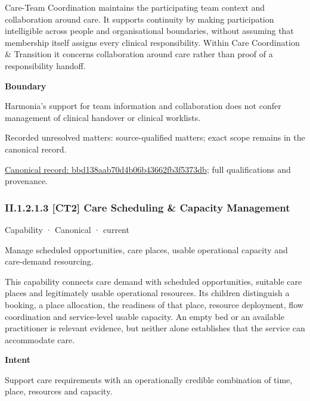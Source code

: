 Care-Team Coordination maintains the participating team context and collaboration around care. It supports continuity by making participation intelligible across people and organisational boundaries, without assuming that membership itself assigns every clinical responsibility. Within Care Coordination \& Transition it concerns collaboration around care rather than proof of a responsibility handoff.



\textbf{Boundary}



Harmonia's support for team information and collaboration does not confer management of clinical handover or clinical worklists.


{\small Recorded unresolved matters: source-qualified matters; exact scope remains in the canonical record.}\par
{\footnotesize \href{../../../../continuum/strategy/capability/bbd138aab70d4b06b43662fb3f5373db.md}{Canonical record: bbd138aab70d4b06b43662fb3f5373db}; full qualifications and provenance.}\par
\subsubsection*{II.1.2.1.3 [CT2] Care Scheduling \& Capacity Management}
\label{navigation:II.1.2.1.3}

\label{element:61dd4b247df14546bf012587164bfe91}
{\small Capability · Canonical · current}\par

Manage scheduled opportunities, care places, usable operational capacity and care-demand resourcing.



This capability connects care demand with scheduled opportunities, suitable care places and legitimately usable operational resources. Its children distinguish a booking, a place allocation, the readiness of that place, resource deployment, flow coordination and service-level usable capacity. An empty bed or an available practitioner is relevant evidence, but neither alone establishes that the service can accommodate care.



\textbf{Intent}



Support care requirements with an operationally credible combination of time, place, resources and capacity.




